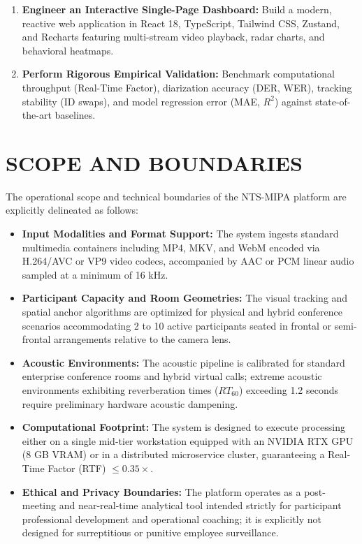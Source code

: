 \documentclass[12pt,a4paper,oneside]{report}
\begin{document}
\begin{enumerate}
    \item \textbf{Engineer an Interactive Single-Page Dashboard:} Build a modern, reactive web application in React 18, TypeScript, Tailwind CSS, Zustand, and Recharts featuring multi-stream video playback, radar charts, and behavioral heatmaps.
    \item \textbf{Perform Rigorous Empirical Validation:} Benchmark computational throughput (Real-Time Factor), diarization accuracy (DER, WER), tracking stability (ID swaps), and model regression error (MAE, $R^2$) against state-of-the-art baselines.
\end{enumerate}

\section{SCOPE AND BOUNDARIES}
The operational scope and technical boundaries of the NTS-MIPA platform are explicitly delineated as follows:
\begin{itemize}
    \item \textbf{Input Modalities and Format Support:} The system ingests standard multimedia containers including MP4, MKV, and WebM encoded via H.264/AVC or VP9 video codecs, accompanied by AAC or PCM linear audio sampled at a minimum of 16 kHz.
    \item \textbf{Participant Capacity and Room Geometries:} The visual tracking and spatial anchor algorithms are optimized for physical and hybrid conference scenarios accommodating 2 to 10 active participants seated in frontal or semi-frontal arrangements relative to the camera lens.
    \item \textbf{Acoustic Environments:} The acoustic pipeline is calibrated for standard enterprise conference rooms and hybrid virtual calls; extreme acoustic environments exhibiting reverberation times ($RT_{60}$) exceeding 1.2 seconds require preliminary hardware acoustic dampening.
    \item \textbf{Computational Footprint:} The system is designed to execute processing either on a single mid-tier workstation equipped with an NVIDIA RTX GPU (8 GB VRAM) or in a distributed microservice cluster, guaranteeing a Real-Time Factor (RTF) $\le 0.35\times$.
    \item \textbf{Ethical and Privacy Boundaries:} The platform operates as a post-meeting and near-real-time analytical tool intended strictly for participant professional development and operational coaching; it is explicitly not designed for surreptitious or punitive employee surveillance.
\end{itemize}
\end{document}

